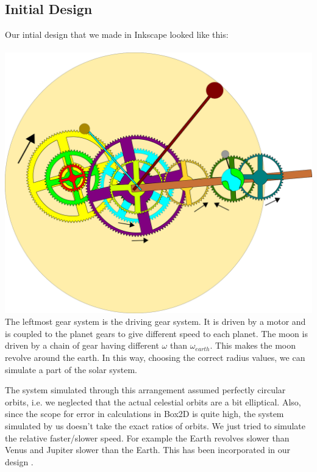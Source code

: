 \documentclass[12pt]{article}
\begin{document}
\subsection{Initial Design}
Our intial design that we made in Inkscape looked like this:
\\ \\
\includegraphics[scale=0.1]{./img/svg.png}
\\

The leftmost gear system is the driving gear system. It is driven by a motor and is coupled to the planet gears to give different speed to each planet. The moon is driven by a chain of gear having different $\omega$ than $\omega_{earth}$. This makes the moon revolve around the earth. In this way, choosing the correct radius values, we can simulate a part of the solar system.

The system simulated through this arrangement assumed perfectly circular orbits, i.e. we neglected that the actual celestial orbits are a bit elliptical. Also, since the scope for error in calculations in Box2D is quite high, the system simulated by us doesn't take the exact ratios of orbits. We just tried to simulate the relative faster/slower speed. For example the Earth revolves slower than Venus and Jupiter slower than the Earth. This has been incorporated in our design \cite{b2d}.
\end{document}
